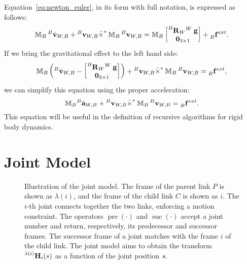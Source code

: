\begin{remark}
%
Equation~\eqref{eq:newton_euler}, in its form with full notation, is expressed as follows:
%
\begin{equation*}
    \masssix_B \velsixd[B]_{W,B} + \velsix[B]_{W,B} \bar{\times}^* \masssix_B \velsix[B]_{W,B} = \masssix_B
    \begin{bmatrix}
        \rot[B]_W {}^W \gravity \\ \zeros_{3\times1}
    \end{bmatrix}
    + \forcesix[B]^{ext}
    .
\end{equation*}
%
If we bring the gravitational effect to the left hand side:
%
\begin{equation*}
    \masssix_B \left( \velsixd[B]_{W,B} -
    \begin{bmatrix}
        \rot[B]_W {}^W \gravity \\ \zeros_{3\times1}
    \end{bmatrix}
    \right) + \velsix[B]_{W,B} \bar{\times}^* \masssix_B \velsix[B]_{W,B} = \forcesix[B]^{ext}
    ,
\end{equation*}
%
we can simplify this equation using the proper acceleration:
%
\begin{equation*}
    \masssix_B {}^B \bar{\mathbf{a}}_{W,B} + \velsix[B]_{W,B} \bar{\times}^* \masssix_B \velsix[B]_{W,B} = \forcesix[B]^{ext}
    .
\end{equation*}
%
This equation will be useful in the definition of recursive algorithms for rigid body dynamics.
%
\end{remark}

\section{Joint Model}
\label{section:joint_model}

\begin{figure}
    \centering
    \caption{Illustration of the joint model. The frame of the parent link $P$ is shown as $\lambda(i)$, and the frame of the child link $C$ is shown as $i$. The $i$-th joint connects together the two links, enforcing a motion constraint. The operators $\operatorname{pre}(\cdot)$ and $\operatorname{suc}(\cdot)$ accept a joint number and return, respectively, its predecessor and successor frames. The successor frame of a joint matches with the frame $i$ of the child link. The joint model aims to obtain the transform $\homo[\lambda(i)]_i(\shape)$ as a function of the joint position $\shape$.}
    \label{fig:joint_model}
\end{figure}

